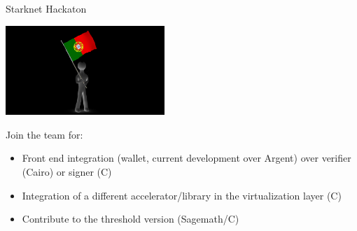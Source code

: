 \documentclass[aspectratio=43]{beamer}
\begin{document}
\begin{frame}{Starknet Hackaton}

\begin{center}
\includegraphics[width=6cm]{images/lisbon.png}
\end{center}

Join the team for:
\begin{itemize}
\item Front end integration (wallet, current development over Argent) over verifier (Cairo) or signer (C)
\item Integration of a different accelerator/library in the virtualization layer (C)
\item Contribute to the threshold version (Sagemath/C)
\end{itemize} 

\end{frame} 
\end{document}
